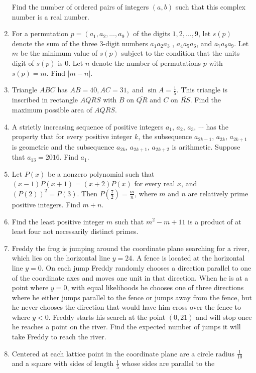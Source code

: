 \documentclass{article}
\begin{document}
\begin{enumerate}[label=\arabic*., itemsep=0.5em]
 Find the number of ordered pairs of integers $(a,b)$ such that this complex number is a real number.\par \vspace{0.5em}\item For a permutation $p = (a_1,a_2,\ldots,a_9)$ of the digits $1,2,\ldots,9$, let $s(p)$ denote the sum of the three $3$-digit numbers $a_1a_2a_3$ , $a_4a_5a_6$, and $a_7a_8a_9$. Let $m$ be the minimum value of $s(p)$ subject to the condition that the units digit of $s(p)$ is $0$. Let $n$ denote the number of permutations $p$ with $s(p) = m$. Find $|m - n|$.\par \vspace{0.5em}\item Triangle $ABC$ has $AB=40,AC=31,$ and $\sin{A}=\frac{1}{5}$. This triangle is inscribed in rectangle $AQRS$ with $B$ on $\overline{QR}$ and $C$ on $\overline{RS}$. Find the maximum possible area of $AQRS$.\par \vspace{0.5em}\item A strictly increasing sequence of positive integers $a_1$, $a_2$, $a_3$, $\cdots$ has the property that for every positive integer $k$, the subsequence $a_{2k-1}$, $a_{2k}$, $a_{2k+1}$ is geometric and the subsequence $a_{2k}$, $a_{2k+1}$, $a_{2k+2}$ is arithmetic. Suppose that $a_{13} = 2016$. Find $a_1$.\par \vspace{0.5em}\item Let $P(x)$ be a nonzero polynomial such that $(x-1)P(x+1)=(x+2)P(x)$ for every real $x$, and $\left(P(2)\right)^2 = P(3)$. Then $P(\tfrac72)=\tfrac{m}{n}$, where $m$ and $n$ are relatively prime positive integers. Find $m + n$.\par \vspace{0.5em}\item Find the least positive integer $m$ such that $m^2 - m + 11$ is a product of at least four not necessarily distinct primes.\par \vspace{0.5em}\item Freddy the frog is jumping around the coordinate plane searching for a river, which lies on the horizontal line $y = 24$. A fence is located at the horizontal line $y = 0$. On each jump Freddy randomly chooses a direction parallel to one of the coordinate axes and moves one unit in that direction. When he is at a point where $y=0$, with equal likelihoods he chooses one of three directions where he either jumps parallel to the fence or jumps away from the fence, but he never chooses the direction that would have him cross over the fence to where $y < 0$. Freddy starts his search at the point $(0, 21)$ and will stop once he reaches a point on the river. Find the expected number of jumps it will take Freddy to reach the river.\par \vspace{0.5em}\item Centered at each lattice point in the coordinate plane are a circle radius $\frac{1}{10}$ and a square with sides of length $\frac{1}{5}$ whose sides are parallel to the 
\end{enumerate}
\end{document}
